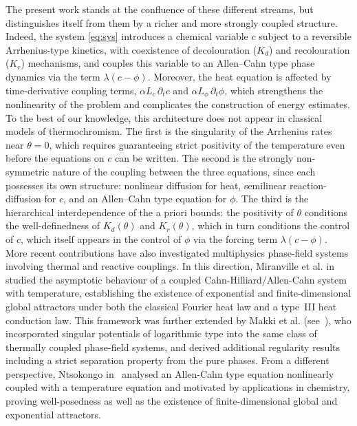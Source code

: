 \documentclass[final,1p,times]{elsarticle}
\numberwithin{equation}{section}
\newcommand{\ptn}{\partial_t}
\begin{document}
	The present work stands at the confluence of these different streams, but distinguishes itself from them by a richer and more strongly coupled structure. Indeed, the system \eqref{eq:sys} introduces a chemical variable $c$ subject to a reversible Arrhenius-type kinetics, with coexistence of decolouration ($K_d$) and recolouration ($K_r$) mechanisms, and couples this variable to an Allen--Cahn type phase dynamics via the term $\lambda(c-\phi)$. Moreover, the heat equation is affected by time-derivative coupling terms, $\alpha L_c\,\ptn c$ and $\alpha L_\phi\,\ptn\phi$, which strengthens the nonlinearity of the problem and complicates the construction of energy estimates. To the best of our knowledge, this architecture does not appear in classical models of thermochromism. The first is the singularity of the Arrhenius rates near $\theta=0$, which requires guaranteeing strict positivity of the temperature even before the equations on $c$ can be written. The second is the strongly non-symmetric nature of the coupling between the three equations, since each possesses its own structure: nonlinear diffusion for heat, semilinear reaction-diffusion for $c$, and an Allen--Cahn type equation for $\phi$. The third is the hierarchical interdependence of the a priori bounds: the positivity of $\theta$ conditions the well-definedness of $K_d(\theta)$ and $K_r(\theta)$, which in turn conditions the control of $c$, which itself appears in the control of $\phi$ via the forcing term $\lambda(c-\phi)$. More recent contributions have also investigated multiphysics phase-field systems 
	involving thermal and reactive couplings. In this direction, Miranville et al. in~\cite{MiranvilleQuintanillaSaoud2020} studied the asymptotic behaviour 
	of a coupled Cahn-Hilliard/Allen-Cahn system with temperature, establishing the 
	existence of exponential and finite-dimensional global attractors under both the 
	classical Fourier heat law and a type~III heat conduction law. This framework was 
	further extended by Makki et al. (see~\cite{MakkiMiranvilleSaoud2020}), 
	who incorporated singular potentials of logarithmic type into the same class of 
	thermally coupled phase-field systems, and derived additional regularity results 
	including a strict separation property from the pure phases. From a different 
	perspective, Ntsokongo in~\cite{Ntsokongo2023} analysed an Allen-Cahn type equation 
	nonlinearly coupled with a temperature equation and motivated by applications in 
	chemistry, proving well-posedness as well as the existence of finite-dimensional 
	global and exponential attractors.
	
\end{document}

